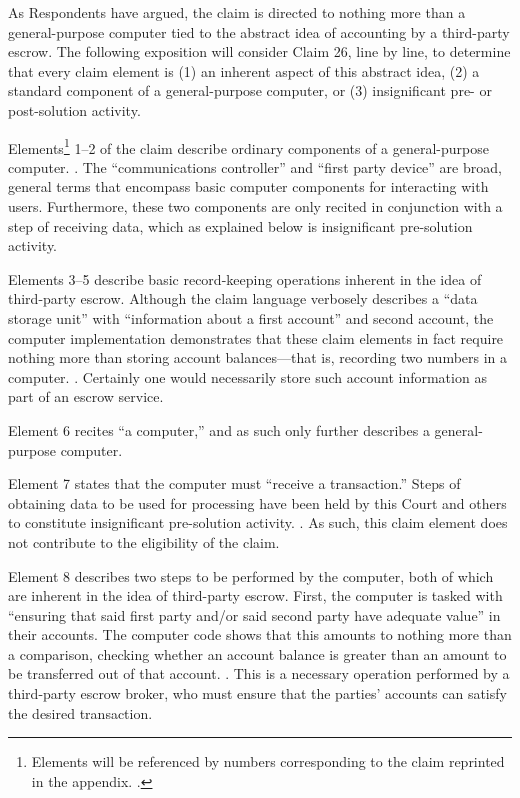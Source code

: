 \documentclass{scotus}
\begin{document}
As Respondents have argued, the claim is directed to nothing more than a
general-purpose computer tied to the abstract idea of accounting by a
third-party escrow. The following exposition will consider Claim 26, line by
line, to determine that every claim element is (1) an inherent aspect of this
abstract idea, (2) a standard component of a general-purpose computer, or
(3) insignificant pre- or post-solution activity.


Elements\footnote{Elements will be referenced by numbers corresponding to
the claim reprinted in the appendix. .} 1--2 of
the
claim describe ordinary components of a general-purpose computer. . The ``communications controller'' and
``first party device'' are broad, general terms that encompass basic computer
components for interacting with users. Furthermore, these two components are
only recited in conjunction with a step of receiving data, which as explained
below is insignificant pre-solution activity.

Elements 3--5 describe basic record-keeping operations inherent in the idea of
third-party escrow. Although the claim language verbosely describes a ``data
storage unit'' with ``information about a first account'' and second account,
the computer implementation demonstrates that these claim elements in fact
require nothing more than storing account balances---that is, recording two
numbers in a computer. .
Certainly one would necessarily store such account information as part of an
escrow service.

Element 6 recites ``a computer,'' and as such only further describes a
general-purpose computer.

Element 7 states that the computer must ``receive a transaction.'' Steps of
obtaining data to be used for processing have been held by this Court and others
to constitute insignificant pre-solution activity. . As such, this
claim element does not contribute to the eligibility of the claim.

Element 8 describes two steps to be performed by the computer, both of which are
inherent in the idea of third-party escrow. First, the computer is tasked with
``ensuring that said first party and/or said second party have adequate value''
in their accounts. The computer code shows that this amounts to nothing more
than a comparison, checking whether an account balance is greater than an amount
to be transferred out of that account. . This is a necessary operation performed by a third-party escrow broker, who
must ensure that the parties' accounts can satisfy the desired transaction.
\end{document}
